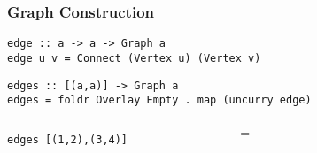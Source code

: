 \documentclass{beamer}
\newcommand{\hs}{\texttt}
\begin{document}
\begin{frame}[fragile]
  \frametitle{Graph Construction}
  \onslide<+->
  \begin{verbatim}
edge :: a -> a -> Graph a
edge u v = Connect (Vertex u) (Vertex v)
  \end{verbatim}
  \onslide<+->
  \begin{verbatim}
edges :: [(a,a)] -> Graph a
edges = foldr Overlay Empty . map (uncurry edge)
  \end{verbatim}
  \onslide<+->
  \vspace{5mm}
  \begin{columns}
    \begin{column}{.3\textwidth}
      \hs{edges [(1,2),(3,4)]}
    \end{column}
    \begin{column}{.05\textwidth}
      {\LARGE $=$}
    \end{column}
    \begin{column}{.4\textwidth}
    \end{column}
  \end{columns}
\end{frame}
\end{document}
